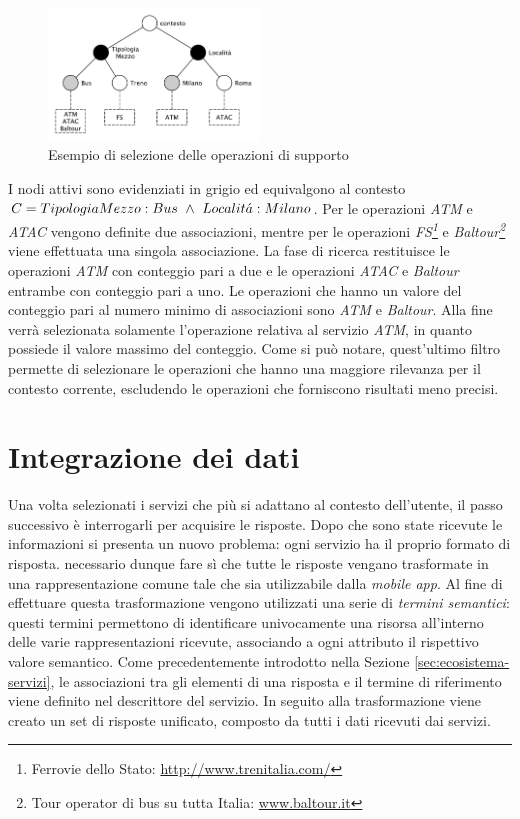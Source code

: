 \begin{figure}[ht]
	\centering
	\includegraphics[width=0.5\textwidth]{3-metodologia-camus/Immagini/esempio-selezione-supporto.pdf}
	\caption{Esempio di selezione delle operazioni di supporto}\label{fig:esempio-selezione-supporto}
\end{figure}

I nodi attivi sono evidenziati in grigio ed equivalgono al contesto $ C = Tipologia\\Mezzo: Bus\ \land\ Localit\acute{a}: Milano $. Per le operazioni \emph{ATM} e \emph{ATAC} vengono definite due associazioni, mentre per le operazioni \emph{FS\footnote{Ferrovie dello Stato: \url{http://www.trenitalia.com/}}} e \emph{Baltour\footnote{Tour operator di bus su tutta Italia: \url{www.baltour.it}}} viene effettuata una singola associazione. La fase di ricerca restituisce le operazioni \emph{ATM} con conteggio pari a due e le operazioni \emph{ATAC} e \emph{Baltour} entrambe con conteggio pari a uno. Le operazioni che hanno un valore del conteggio pari al numero minimo di associazioni sono \emph{ATM} e \emph{Baltour}. Alla fine verrà selezionata solamente l'operazione relativa al servizio \emph{ATM}, in quanto possiede il valore massimo del conteggio. Come si può notare, quest'ultimo filtro permette di selezionare le operazioni che hanno una maggiore rilevanza per il contesto corrente, escludendo le operazioni che forniscono risultati meno precisi.

\section{Integrazione dei dati\label{sec:integrazione-dati}}

Una volta selezionati i servizi che più si adattano al contesto dell'utente, il passo successivo è interrogarli per acquisire le risposte. Dopo che sono state ricevute le informazioni si presenta un nuovo problema: ogni servizio ha il proprio formato di risposta. \upe necessario dunque fare sì che tutte le risposte vengano trasformate in una rappresentazione comune tale che sia utilizzabile dalla \emph{mobile app}. Al fine di effettuare questa trasformazione vengono utilizzati una serie di \emph{termini semantici}: questi termini permettono di identificare univocamente una risorsa all'interno delle varie rappresentazioni ricevute, associando a ogni attributo il rispettivo valore semantico. Come precedentemente introdotto nella Sezione \ref{sec:ecosistema-servizi}, le associazioni tra gli elementi di una risposta e il termine di riferimento viene definito nel descrittore del servizio. In seguito alla trasformazione viene creato un set di risposte unificato, composto da tutti i dati ricevuti dai servizi.

